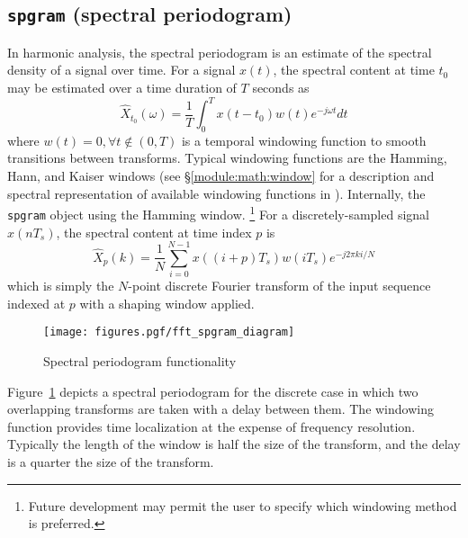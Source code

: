 %

%
%
\subsection{{\tt spgram} (spectral periodogram)}
\label{module:fft:spgram}

In harmonic analysis, the spectral periodogram is an estimate of the
spectral density of a signal over time.
For a signal $x(t)$, the spectral content at time $t_0$ may be estimated
over a time duration of $T$ seconds as
\[
    \hat{X}_{t_0}(\omega) =
        \frac{1}{T} \int_{0}^{T} { x(t-t_0)w(t)e^{-j\omega t} dt }
\]
where $w(t) = 0,\forall t \notin (0,T)$
is a temporal windowing function to smooth transitions
between transforms.
Typical windowing functions are the Hamming, Hann, and Kaiser windows
(see \S\ref{module:math:window} for a description and spectral
representation of available windowing functions in \liquid).
Internally, the {\tt spgram} object using the Hamming window.%
\footnote{Future development may permit the user to specify which
          windowing method is preferred.}
%
For a discretely-sampled signal $x(nT_s)$, the spectral content at time
index $p$ is
\[
    \hat{X}_p(k) = 
        \frac{1}{N}
        \sum_{i=0}^{N-1}{
            x((i+p)T_s) w(iT_s) e^{-j 2 \pi k i/N}
        }
\]
%
which is simply the $N$-point discrete Fourier transform of the input
sequence indexed at $p$ with a shaping window applied.
%
\begin{figure}
\centering
  \texttt{[image: figures.pgf/fft\_spgram\_diagram]}
\caption{Spectral periodogram functionality}
\label{fig:module:fft:spgram:diagram}
\end{figure}
%
Figure~\ref{fig:module:fft:spgram:diagram} depicts a spectral
periodogram for the discrete case
in which two overlapping transforms are taken with a delay between them.
The windowing function provides time localization at the expense of
frequency resolution.
Typically the length of the window is half the size of the transform,
and the delay is a quarter the size of the transform.

